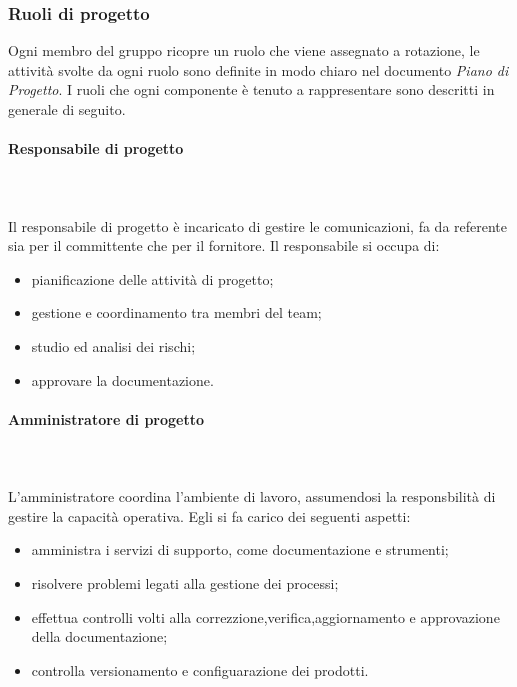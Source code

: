 		\subsubsection{Ruoli di progetto}%
		Ogni membro del gruppo ricopre un ruolo che viene assegnato a rotazione, le attività svolte da ogni ruolo sono definite in modo chiaro nel documento \textit{Piano di Progetto}.
		I ruoli che ogni componente è tenuto a rappresentare sono descritti in generale di seguito.
			\paragraph{Responsabile di progetto} \mbox{}\\ \mbox{}\\
			Il responsabile di progetto è incaricato di gestire le comunicazioni, fa da referente sia per il committente che per il fornitore.\newline
			Il responsabile si occupa di:
			\begin{itemize}
				\item pianificazione delle attività di progetto;
				\item  gestione e coordinamento tra membri del team;
				\item studio ed analisi dei rischi;
				\item approvare la documentazione.
			\end{itemize}
			\paragraph{Amministratore di progetto} \mbox{}\\ \mbox{}\\
			L'amministratore coordina l'ambiente di lavoro, assumendosi la responsbilità di gestire la capacità operativa.\newline
			Egli si fa carico dei seguenti aspetti:
			\begin{itemize}
				\item amministra i servizi di supporto, come documentazione e strumenti;
				\item risolvere problemi legati alla gestione dei processi;
				\item effettua controlli volti alla correzzione,verifica,aggiornamento e approvazione della documentazione;
				\item controlla versionamento e configuarazione dei prodotti.
			\end{itemize}
